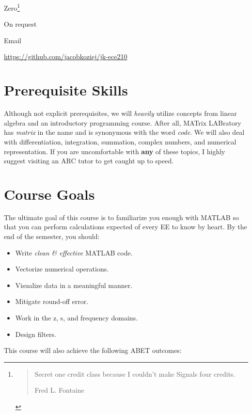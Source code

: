 \documentclass{article}
\begin{document}
\noindent
{} Zero\footnote{\blockquote[Fred L. Fontaine]{Secret one
credit class because I couldn't make Signals four credits.}}

\noindent
{} On request

\noindent
{} Email

\noindent
{} \url{https://github.com/jacobkoziej/jk-ece210}

\section{Prerequisite Skills}

Although not explicit prerequisites, we will \emph{heavily} utilize
concepts from linear algebra and an introductory programming course.
After all, MATrix LABratory has \emph{matrix} in the name and is
synonymous with the word \emph{code}.  We will also deal with
differentiation, integration, summation, complex numbers, and numerical
representation.  If you are uncomfortable with \textbf{any} of these
topics, I highly suggest visiting an ARC tutor to get caught up to
speed.

\section{Course Goals}

The ultimate goal of this course is to familiarize you enough with
MATLAB so that you can perform calculations expected of every EE to know
by heart.  By the end of the semester, you should:

\begin{itemize}
	\item
		Write \emph{clean \& effective} MATLAB code.

	\item
		Vectorize numerical operations.

	\item
		Visualize data in a meaningful manner.

	\item
		Mitigate round-off error.

	\item
		Work in the z, s, and frequency domains.

	\item
		Design filters.
\end{itemize}

\noindent
This course will also achieve the following ABET outcomes:
\end{document}
